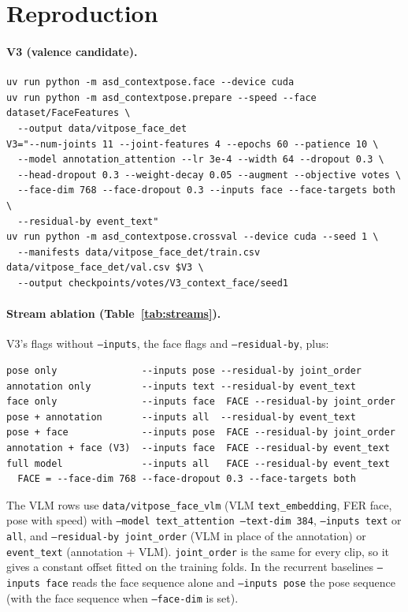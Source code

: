 \documentclass[11pt]{article}
\newcommand{\code}[1]{\texttt{#1}}
\begin{document}
\appendix
\section{Reproduction}

\paragraph{V3 (valence candidate).}
\begin{verbatim}
uv run python -m asd_contextpose.face --device cuda
uv run python -m asd_contextpose.prepare --speed --face dataset/FaceFeatures \
  --output data/vitpose_face_det
V3="--num-joints 11 --joint-features 4 --epochs 60 --patience 10 \
  --model annotation_attention --lr 3e-4 --width 64 --dropout 0.3 \
  --head-dropout 0.3 --weight-decay 0.05 --augment --objective votes \
  --face-dim 768 --face-dropout 0.3 --inputs face --face-targets both \
  --residual-by event_text"
uv run python -m asd_contextpose.crossval --device cuda --seed 1 \
  --manifests data/vitpose_face_det/train.csv data/vitpose_face_det/val.csv $V3 \
  --output checkpoints/votes/V3_context_face/seed1
\end{verbatim}

\paragraph{Stream ablation (Table~\ref{tab:streams}).} V3's flags without \code{--inputs}, the face flags and \code{--residual-by}, plus:
\begin{verbatim}
pose only               --inputs pose --residual-by joint_order
annotation only         --inputs text --residual-by event_text
face only               --inputs face  FACE --residual-by joint_order
pose + annotation       --inputs all  --residual-by event_text
pose + face             --inputs pose  FACE --residual-by joint_order
annotation + face (V3)  --inputs face  FACE --residual-by event_text
full model              --inputs all   FACE --residual-by event_text
  FACE = --face-dim 768 --face-dropout 0.3 --face-targets both
\end{verbatim}
The VLM rows use \code{data/vitpose\_face\_vlm} (VLM \code{text\_embedding}, FER face, pose with speed) with \code{--model text\_attention --text-dim 384}, \code{--inputs text} or \code{all}, and \code{--residual-by joint\_order} (VLM in place of the annotation) or \code{event\_text} (annotation + VLM). \code{joint\_order} is the same for every clip, so it gives a constant offset fitted on the training folds. In the recurrent baselines \code{--inputs face} reads the face sequence alone and \code{--inputs pose} the pose sequence (with the face sequence when \code{--face-dim} is set).
\end{document}
